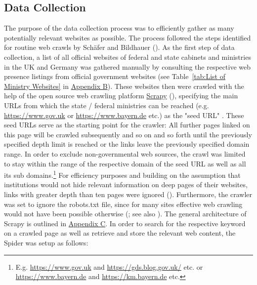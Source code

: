 \subsection{Data Collection}
The purpose of the data collection process was to efficiently gather as many potentially relevant websites as possible. The process followed the steps identified for routine web crawls by Schäfer and Bildhauer (\cite*{Schafer2012}). As the first step of data collection, a list of all official websites of federal and state cabinets and ministries in the UK and Germany was gathered manually by consulting the respective web presence listings from official government websites (see Table~\ref{tab:List of Ministry Websites} in \href{Appendix B}{Appendix B}). These websites then were crawled with the help of the open source web crawling platform \href{https://scrapy.org }{Scrapy} (\cite{Kouzis-Loukas2016}), specifying the main URLs from which the state / federal ministries can be reached (e.g. \url{https://www.gov.uk} or \url{https://www.bayern.de} etc.) as the "seed URL" \parencite[p. 115]{Barbaresi2015}. These seed URLs serve as the starting point for the crawler: All further pages linked on this page will be crawled subsequently and so on and so forth until the previously specified depth limit is reached or the links leave the previously specified domain range. In order to exclude non-governmental web sources, the crawl was limited to stay within the range of the respective domain of the seed URL as well as all its sub domains.\footnote{E.g. \url{https://www.gov.uk} and \url{https://gds.blog.gov.uk/} etc. or \url{https://www.bayern.de} and \url{https://km.bayern.de} etc.} For efficiency purposes and building on the assumption that institutions would not hide relevant information on deep pages of their websites, links with greater depth than ten pages were ignored (\cite{Scrapy2018, Wang2019}). Furthermore, the crawler was set to ignore the robots.txt file, since for many sites effective web crawling would not have been possible otherwise (\cite{Sun2007}; see also \cite[p. 125]{Barbaresi2015}). The general architecture of Scrapy is outlined in \href{Appendix C}{Appendix C}. In order to search for the respective keyword on a crawled page as well as retrieve and store the relevant web content, the Spider was setup as follows:
%
